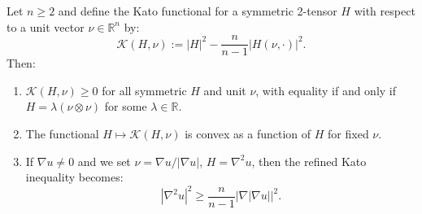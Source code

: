 \begin{lemma}\label{lem:KatoConvexity}
Let $n \ge 2$ and define the Kato functional for a symmetric 2-tensor $H$ with respect to a unit vector $\nu \in \mathbb{R}^n$ by:
\begin{equation}
    \mathcal{K}(H, \nu) := |H|^2 - \frac{n}{n-1} |H(\nu, \cdot)|^2.
\end{equation}
Then:
\begin{enumerate}
    \item[(i)] $\mathcal{K}(H, \nu) \ge 0$ for all symmetric $H$ and unit $\nu$, with equality if and only if $H = \lambda (\nu \otimes \nu)$ for some $\lambda \in \mathbb{R}$.
    \item[(ii)] The functional $H \mapsto \mathcal{K}(H, \nu)$ is convex as a function of $H$ for fixed $\nu$.
    \item[(iii)] If $\nabla u \ne 0$ and we set $\nu = \nabla u / |\nabla u|$, $H = \nabla^2 u$, then the refined Kato inequality becomes:
    \begin{equation}
        |\nabla^2 u|^2 \ge \frac{n}{n-1} |\nabla |\nabla u||^2.
    \end{equation}
\end{enumerate}
\end{lemma}

